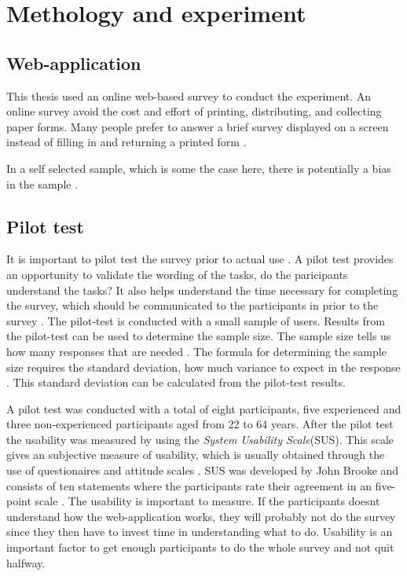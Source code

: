 \chapter{Methology and experiment}

\section{Web-application}
This thesis used an online web-based survey to conduct the experiment. An online survey avoid the cost and effort of printing, distributing, and collecting paper forms. Many people prefer to answer a brief survey displayed on a screen instead of filling in and returning a printed form \citep{Ben2009}.   

In a self selected sample, which is some the case here, there is potentially a bias in the sample \citep{Ben2009}. %

\section{Pilot test}
It is important to pilot test the survey prior to actual use \citep{Ben2009}. A pilot test provides an opportunity to validate the wording of the tasks, do the paricipants understand the tasks? It also helps understand the time necessary for completing the survey, which should be communicated to the participants in prior to the survey \citep{Schade2015}. The pilot-test is conducted with a small sample of users. Results from the pilot-test can be used to determine the sample size. The sample size tells us how many responses that are needed \citep{Smith2013}. The formula for determining the sample size requires the standard deviation, how much variance to expect in the response \citep{Smith2013}. This standard deviation can be calculated from the pilot-test results. 

A pilot test was conducted with a total of eight participants, five experienced and three non-experienced participants aged from 22 to 64 years.  After the pilot test the usability was measured by using the \textit{System Usability Scale}(SUS). This scale gives an subjective measure of usability, which is usually obtained through the use of questionaires and attitude scales \citep{Brooke1996}. SUS was developed by John Brooke and consists of ten statements where the participants rate their agreement in an five-point scale \citep{Ben2009}. The usability is important to measure. If the participants doesnt understand how the web-application works, they will probably not do the survey since they then have to invest time in understanding what to do. %
Usability is an important factor to get enough participants to do the whole survey and not quit halfway. 

